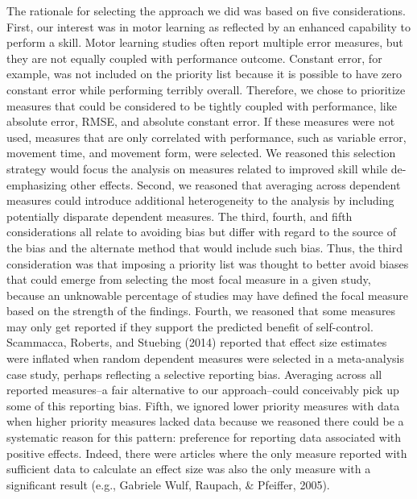 \documentclass[
  english,
  man,floatsintext]{apa7}
\begin{document}
The rationale for selecting the approach we did was based on five considerations. First, our interest was in motor learning as reflected by an enhanced capability to perform a skill. Motor learning studies often report multiple error measures, but they are not equally coupled with performance outcome. Constant error, for example, was not included on the priority list because it is possible to have zero constant error while performing terribly overall. Therefore, we chose to prioritize measures that could be considered to be tightly coupled with performance, like absolute error, RMSE, and absolute constant error. If these measures were not used, measures that are only correlated with performance, such as variable error, movement time, and movement form, were selected. We reasoned this selection strategy would focus the analysis on measures related to improved skill while de-emphasizing other effects. Second, we reasoned that averaging across dependent measures could introduce additional heterogeneity to the analysis by including potentially disparate dependent measures. The third, fourth, and fifth considerations all relate to avoiding bias but differ with regard to the source of the bias and the alternate method that would include such bias. Thus, the third consideration was that imposing a priority list was thought to better avoid biases that could emerge from selecting the most focal measure in a given study, because an unknowable percentage of studies may have defined the focal measure based on the strength of the findings. Fourth, we reasoned that some measures may only get reported if they support the predicted benefit of self-control. Scammacca, Roberts, and Stuebing (2014) reported that effect size estimates were inflated when random dependent measures were selected in a meta-analysis case study, perhaps reflecting a selective reporting bias. Averaging across all reported measures--a fair alternative to our approach--could conceivably pick up some of this reporting bias. Fifth, we ignored lower priority measures with data when higher priority measures lacked data because we reasoned there could be a systematic reason for this pattern: preference for reporting data associated with positive effects. Indeed, there were articles where the only measure reported with sufficient data to calculate an effect size was also the only measure with a significant result (e.g., Gabriele Wulf, Raupach, \& Pfeiffer, 2005).

\begingroup\fontsize{10}{12}\selectfont
\end{document}
